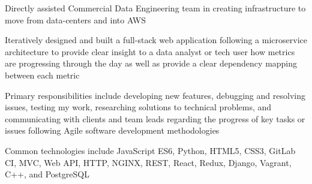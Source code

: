 \documentclass[letterpaper]{deedy-resume} %
\begin{document}
\begin{minipage}[t]{0.66\textwidth}
\begin{tightitemize}
\item Directly assisted Commercial Data Engineering team in creating infrastructure to move from data-centers and into AWS
\item Iteratively designed and built a full-stack web application following a microservice architecture to provide clear insight to a data analyst or tech user how metrics are progressing through the day as well as provide a clear dependency mapping between each metric
\end{tightitemize}

\sectionspace %



\begin{tightitemize}
\item Primary responsibilities include developing new features, debugging and resolving issues, testing my work, researching solutions to technical problems, and communicating with clients and team leads regarding the progress of key tasks or issues following Agile software development methodologies
\item  Common technologies include JavaScript ES6, Python, HTML5, CSS3, GitLab CI, MVC, Web API, HTTP, NGINX, REST, React, Redux, Django, Vagrant, C++, and PostgreSQL
\end{tightitemize}


\end{minipage}
\end{document}
